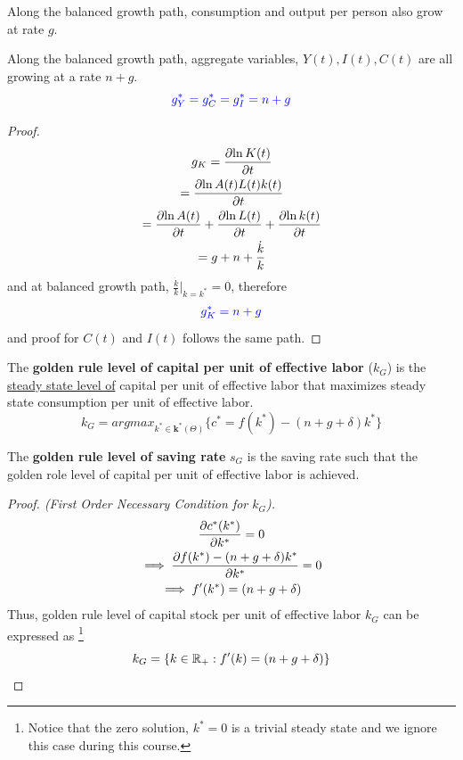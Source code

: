 \documentclass[11pt]{article}
\begin{document}
			\begin{proposition}
				Along the balanced growth path, consumption and output per person also grow at rate $g$.
			\end{proposition}
			
			\begin{proposition}
				Along the balanced growth path, aggregate variables, $Y(t), I(t), C(t)$ are all growing at a rate $n + g$.
				\begin{equation}
					\textcolor{blue}{
						g_{Y}^* = g_{C}^* = g_{I}^* = n + g
						}
				\end{equation}
			\end{proposition}
			\begin{proof}
				\begin{gather*}
				g_{K} = \frac{\partial{\ln{K(t)}}}{\partial{t}} \\
				= \frac{\partial{\ln{A(t)L(t)k(t)}}}{\partial{t}} \\
				= \frac{\partial{\ln{A(t)}}}{\partial{t}} + \frac{\partial{\ln{L(t)}}}{\partial{t}} + \frac{\partial{\ln{k(t)}}}{\partial{t}} \\
				= g + n + \frac{\dot{k}}{k}
				\end{gather*}
				and at balanced growth path, $\frac{\dot{k}}{k}|_{k=k^*} = 0$, therefore 
				\begin{equation}
					\textcolor{blue}{
						g_K^* = n + g
					}
				\end{equation}
				and proof for $C(t)$ and $I(t)$ follows the same path.
			\end{proof}
		
		\begin{definition}
			The \textbf{golden rule level of capital per unit of effective labor} ($k_G$) is the \ul{steady state level of} capital per unit of effective labor that maximizes steady state consumption per unit of effective labor.
				\[
					k_G = argmax_{k^* \in \textbf{k}^*(\Theta)} \{c^* = f(k^*) - (n+g+ \delta) k^*\}
				\]
		\end{definition}
		
		\begin{definition}
			The \textbf{golden rule level of saving rate} $s_G$ is the saving rate such that the golden role level of capital per unit of effective labor is achieved.
		\end{definition}
		
		\begin{proof}[Proof. (First Order Necessary Condition for $k_G$)]
			\begin{gather*}
				\frac{\partial{c^*(k^*)}}{\partial{k^*}} = 0 \\
				\implies \frac{\partial{f(k^*) - (n+g+\delta)k^*}}{\partial{k^*}} = 0 \\
				\implies f'(k^*) = (n+g+\delta)
			\end{gather*}
			Thus, golden rule level of capital stock per unit of effective labor $k_G$ can be expressed as \footnote{Notice that the zero solution, $k^* = 0$ is a trivial steady state and we ignore this case during this course.}
			\begin{equation}
				k_G = \{k \in \mathbb{R}_{+}: f'(k) = (n+g+\delta)\}
			\end{equation}
		\end{proof}
		
\end{document}
